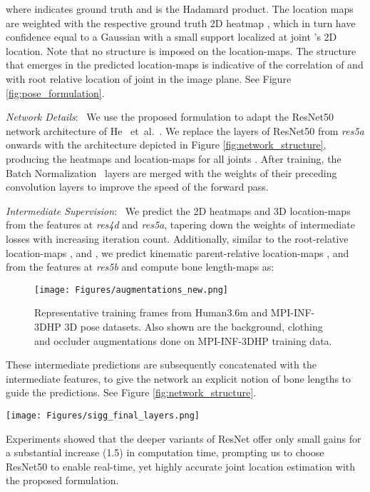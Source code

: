 \documentclass[acmtog]{acmart}
\newcommand{\parahead}[1]{\vspace{5pt}\noindent\emph{#1}:\ }
\newcommand{\etal}{~et~al.\ }
\newcommand{\change}[1]{{#1}}
\begin{document}
where  indicates ground truth and  is the Hadamard product.
The location maps are weighted with the respective ground truth 2D heatmap , which in turn
have confidence equal to a Gaussian with a small support localized at joint 's 2D location.
Note that no structure is imposed on the location-maps. The structure that emerges in the predicted location-maps is indicative of the correlation of  and  with root relative location of joint  in the image plane. 
See Figure \ref{fig:pose_formulation}.

\parahead{Network Details}
We use the proposed formulation to adapt the ResNet50 network architecture of He \etal {}. We replace the layers of ResNet50 from \emph{res5a} onwards with the architecture depicted in Figure \ref{fig:network_structure}, producing the heatmaps and location-maps for all joints . \change{After training, the Batch Normalization~\cite{ioffe_batchnorm_icml15} layers are merged with the weights of their preceding convolution layers to improve the speed of the forward pass.}

\parahead{Intermediate Supervision}
We predict the 2D heatmaps and 3D location-maps from the features at \textit{res4d} and \textit{res5a}, tapering down the weights of intermediate losses with increasing iteration count. 
Additionally, similar to the root-relative location-maps ,  and , we predict kinematic parent-relative location-maps ,  and  from the features at \emph{res5b} and compute bone length-maps as:

\begin{figure}[t!]
	\centering\texttt{[image: Figures/augmentations\_new.png]}
	\caption{Representative training frames from Human3.6m and MPI-INF-3DHP 3D pose datasets. Also shown are the background, clothing and occluder augmentations done on MPI-INF-3DHP training data.}
	\label{fig:augmentation}
\end{figure}
These intermediate predictions are subsequently concatenated with the intermediate features, to give the network an explicit notion of bone lengths to guide the predictions. See Figure \ref{fig:network_structure}.

\begin{figure*}[t]
\texttt{[image: Figures/sigg\_final\_layers.png]}
\caption{Network Structure. The structure above is preceded by ResNet50/100 till level 4. We use kinematic parent relative 3D joint location predictions , ,  as well as bone length maps  constructed from these as auxiliary tasks.The network predicts 2D location heatmaps  and root relative 3D joint locations , , . Refer to Section \ref{sec:network}.}
   \label{fig:network_structure}
\end{figure*}
Experiments showed that the deeper variants of ResNet offer only small gains for a substantial increase (1.5) in computation time, prompting us to choose ResNet50 to enable real-time, yet highly accurate joint location estimation with the proposed formulation.
\end{document}
